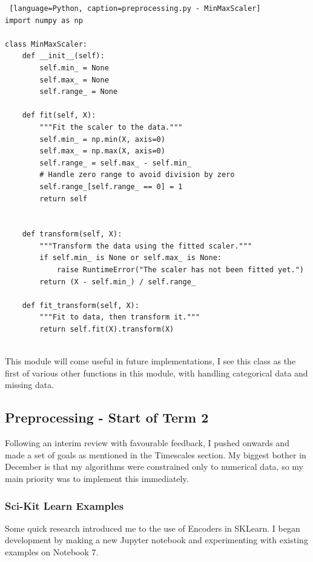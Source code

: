 \documentclass[letterpaper,10pt]{article}
\begin{document}
\begin{lstlisting} [language=Python, caption=preprocessing.py - MinMaxScaler]
import numpy as np

class MinMaxScaler:
    def __init__(self):
        self.min_ = None
        self.max_ = None
        self.range_ = None

    def fit(self, X):
        """Fit the scaler to the data."""
        self.min_ = np.min(X, axis=0)
        self.max_ = np.max(X, axis=0)
        self.range_ = self.max_ - self.min_
        # Handle zero range to avoid division by zero
        self.range_[self.range_ == 0] = 1
        return self
        

    def transform(self, X):
        """Transform the data using the fitted scaler."""
        if self.min_ is None or self.max_ is None:
            raise RuntimeError("The scaler has not been fitted yet.")
        return (X - self.min_) / self.range_

    def fit_transform(self, X):
        """Fit to data, then transform it."""
        return self.fit(X).transform(X)
      
\end{lstlisting}

This module will come useful in future implementations, I see this class as the first of various other functions in this module, with handling categorical data and missing data. \par

\subsection{Preprocessing - Start of Term 2}
Following an interim review with favourable feedback, I pushed onwards and made a set of goals as mentioned in the Timescales section. My biggest bother in December is that my algorithms were constrained only to numerical data, so my main priority was to implement this immediately. \par
\subsubsection{Sci-Kit Learn Examples}
Some quick research introduced me to the use of Encoders in SKLearn. I began development by making a new Jupyter notebook and experimenting with existing examples on Notebook 7. \par
\end{document}
